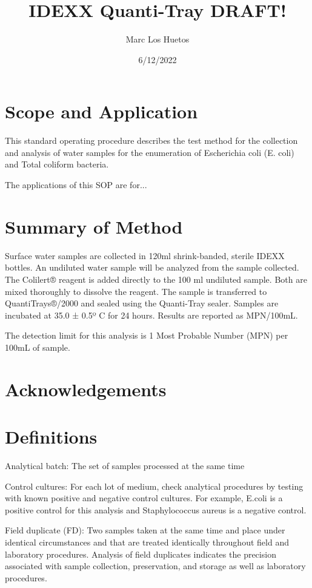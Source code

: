 \documentclass[12pt]{../SOP4_alpha}\usepackage[]{graphicx}\usepackage[]{color}
\title{IDEXX Quanti-Tray DRAFT!}
\date{6/12/2022}
\author{Marc Los Huetos}
\begin{document}
\maketitle

\section{Scope and Application}

\NP This standard operating procedure describes the test method for the collection and analysis of water samples for the enumeration of Escherichia coli (E. coli) and
Total coliform bacteria.

\NP The applications of this SOP are for...

\section{Summary of Method}

\NP Surface water samples are collected in 120ml shrink-banded, sterile IDEXX bottles. An undiluted water sample will be analyzed from the sample collected.
The Colilert® reagent is added directly to the 100 ml undiluted sample. Both are mixed thoroughly to dissolve the reagent. The sample is transferred to QuantiTrays®/2000 and sealed using the Quanti-Tray sealer. Samples are incubated at 35.0 ± 0.5º C for 24 hours. Results are reported as MPN/100mL. 

\NP The detection limit for this analysis is 1 Most Probable Number (MPN) per 100mL of sample. 

\tableofcontents

\newpage

\section{Acknowledgements}

\section{Definitions}

\NP Analytical batch: The set of samples processed at the same time

\NP Control cultures: For each lot of medium, check analytical procedures by
testing with known positive and negative control cultures. For example,
E.coli is a positive control for this analysis and Staphylococcus aureus is a
negative control.

\NP Field duplicate (FD): Two samples taken at the same time and place under
identical circumstances and that are treated identically throughout field
and laboratory procedures. Analysis of field duplicates indicates the
precision associated with sample collection, preservation, and storage as
well as laboratory procedures.
\end{document}

